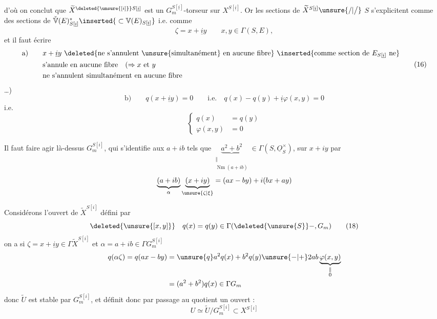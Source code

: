  d'où on conclut que $\widetilde X^{\deleted{\unsure{[i]}}S[\underline i]}$ est un $G_m^{S[\underline i]}$-torseur sur $X^{S[\underline i]}$. Or les sections \inserted{$\unsure{\zeta|\xi}$} de
$\widetilde X^{S[\underline i]}\unsure{/|\big/}$  $S$ s'explicitent comme des sections de $\check{\mathbb V}(E)^*_{S[\underline i]}\inserted{{}\subset\mathbb V(E)_{S[\underline i]}}$ i.e.  comme
\[
\zeta=x+\underline i y\qquad x,y\in\Gamma(S,E),
\]
et il faut écrire
\[
\begin{aligned}\text{a)}\qquad &x+\underline i y\ \deleted{\text{ne s'annulent \unsure{simultanément} en aucune fibre}}\ \inserted{\text{comme section de }E_{S[\underline i]}\text{ ne}}\\&\text{s'annule en aucune fibre}\quad(\Rightarrow x\ \text{et }y\\&\text{ne s'annulent simultanément en aucune fibre}\end{aligned}\tag*{(16)}
\]
\ldots)
\[
\text{b)}\qquad q(x+\underline i y)=0\qquad\text{i.e.}\quad q(x)-q(y)+\underline i\varphi(x,y)=0
\]
i.e.
\[
\left\{\begin{aligned}q(x)&=q(y)\\\varphi(x,y)&=0\end{aligned}\right.\tag*{(17)}
\]

Il faut faire agir là-dessus $G_m^{S[i]}$, qui s'identifie aux $a+ib$ tels que $\underbrace{a^2+b^2}_{\substack{\Vert\\\operatorname{Nm}(a+ib)}}\in\Gamma(S,\underline O_S^\times)$,  sur $x+iy$ par
\[
\underbrace{(a+ib)}_{\alpha}\underbrace{(x+iy)}_{\unsure{\zeta|\xi}}=(ax-by)+i(bx+ay)
\]

Considérons l'ouvert  de $\widetilde X^{S[i]}$ défini par
\[
\deleted{\unsure{[x,y]}}\quad q(x)=q(y)\in\Gamma(\deleted{\unsure{S}}-,G_m)\tag*{(18)}
\]
on a si $\zeta=x+\underline i y\in\Gamma\widetilde X^{S[i]}$ et $\alpha=a+ib\in\Gamma G_m^{S[i]}$
\[
\begin{aligned}q(\alpha\zeta)=q(ax-by)&=\unsure{q}a^2q(x)+b^2q(y)\unsure{-|+}2ab\underbrace{\varphi(x,y)}_{\substack{\Vert\\0}}\\&=(a^2+b^2)q(x)\in\Gamma G_m\end{aligned}
\]
donc $\widetilde U$ est stable par $G_m^{S[i]}$, et définit donc  par passage au quotient un ouvert :
\[
U\simeq\widetilde U/G_m^{S[i]}\subset X^{S[i]}\tag*{(19)}
\]

